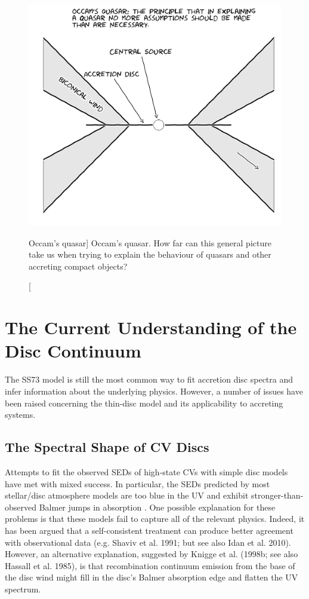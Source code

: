 \begin{figure}
\centering
\includegraphics[width=1.0\textwidth]{figures/01-intro/occam.jpg}
\caption
[Occam's quasar]
{
Occam's quasar. How far can this general picture take us when trying to explain
the behaviour of quasars and other accreting compact objects?
} 
\label{fig:occam}
\end{figure}


\section{The Current Understanding of the Disc Continuum}

\label{sec:disc_continuum}

The SS73 model is still the most common way to fit accretion disc spectra and infer
information about the underlying physics. However, 
a number of issues have been raised concerning the thin-disc model and
its applicability to accreting systems. 

\subsection{The Spectral Shape of CV Discs}


Attempts to fit the observed SEDs of high-state CVs with simple disc models 
have met with mixed success. In
particular, the SEDs predicted by most stellar/disc atmosphere models 
are too blue in the UV \citep{wade1988,long1991,long1994,knigge1998} and exhibit
stronger-than-observed Balmer jumps in absorption 
\citep{wade1984,haug1987,ladous1989b,knigge1998}. One possible
explanation for these problems is that these models fail to capture
all of the relevant physics. Indeed, it has been argued that a
self-consistent treatment can produce better agreement with 
observational data (e.g. Shaviv et al. 1991;  but see also Idan et al. 2010).
\nocite{idanshaviv2010} \nocite{shaviv1991}
However, an alternative explanation, suggested by Knigge et al.
(1998b; see also Hassall et al. 1985)\nocite{KLWB98,hassall}, 
is that recombination continuum emission from the base of the 
disc wind might fill in the disc's Balmer absorption edge and flatten 
the UV spectrum.

